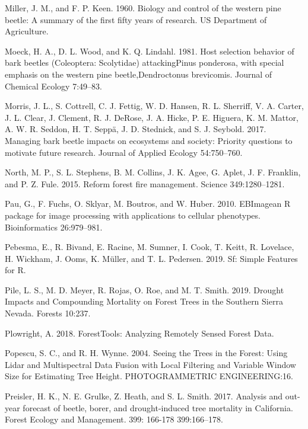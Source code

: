 \documentclass[]{article}
\begin{document}
\hypertarget{ref-miller1960}{}
Miller, J. M., and F. P. Keen. 1960. Biology and control of the western
pine beetle: A summary of the first fifty years of research. US
Department of Agriculture.

\hypertarget{ref-moeck1981}{}
Moeck, H. A., D. L. Wood, and K. Q. Lindahl. 1981. Host selection
behavior of bark beetles (Coleoptera: Scolytidae) attackingPinus
ponderosa, with special emphasis on the western pine beetle,Dendroctonus
brevicomis. Journal of Chemical Ecology 7:49--83.

\hypertarget{ref-morris2017}{}
Morris, J. L., S. Cottrell, C. J. Fettig, W. D. Hansen, R. L. Sherriff,
V. A. Carter, J. L. Clear, J. Clement, R. J. DeRose, J. A. Hicke, P. E.
Higuera, K. M. Mattor, A. W. R. Seddon, H. T. Seppä, J. D. Stednick, and
S. J. Seybold. 2017. Managing bark beetle impacts on ecosystems and
society: Priority questions to motivate future research. Journal of
Applied Ecology 54:750--760.

\hypertarget{ref-north2015}{}
North, M. P., S. L. Stephens, B. M. Collins, J. K. Agee, G. Aplet, J. F.
Franklin, and P. Z. Fule. 2015. Reform forest fire management. Science
349:1280--1281.

\hypertarget{ref-pau2010}{}
Pau, G., F. Fuchs, O. Sklyar, M. Boutros, and W. Huber. 2010. EBImagean
R package for image processing with applications to cellular phenotypes.
Bioinformatics 26:979--981.

\hypertarget{ref-pebesma2019}{}
Pebesma, E., R. Bivand, E. Racine, M. Sumner, I. Cook, T. Keitt, R.
Lovelace, H. Wickham, J. Ooms, K. Müller, and T. L. Pedersen. 2019. Sf:
Simple Features for R.

\hypertarget{ref-pile2019}{}
Pile, L. S., M. D. Meyer, R. Rojas, O. Roe, and M. T. Smith. 2019.
Drought Impacts and Compounding Mortality on Forest Trees in the
Southern Sierra Nevada. Forests 10:237.

\hypertarget{ref-plowright2018}{}
Plowright, A. 2018. ForestTools: Analyzing Remotely Sensed Forest Data.

\hypertarget{ref-popescu2004}{}
Popescu, S. C., and R. H. Wynne. 2004. Seeing the Trees in the Forest:
Using Lidar and Multispectral Data Fusion with Local Filtering and
Variable Window Size for Estimating Tree Height. PHOTOGRAMMETRIC
ENGINEERING:16.

\hypertarget{ref-preisler2017}{}
Preisler, H. K., N. E. Grulke, Z. Heath, and S. L. Smith. 2017. Analysis
and out-year forecast of beetle, borer, and drought-induced tree
mortality in California. Forest Ecology and Management. 399: 166-178
399:166--178.
\end{document}
